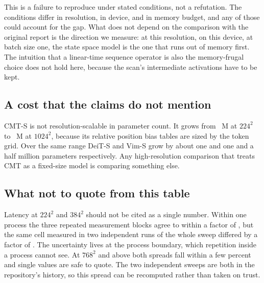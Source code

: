 This is a failure to reproduce under stated conditions, not a refutation.
The conditions differ in resolution, in device, and in memory budget, and any
of those could account for the gap. What does not depend on the comparison
with the original report is the direction we measure: at this resolution, on
this device, at batch size one, the state space model is the one that runs
out of memory first. The intuition that a linear-time sequence operator is
also the memory-frugal choice does not hold here, because the scan's
intermediate activations have to be kept.

\subsection{A cost that the claims do not mention}

CMT-S is not resolution-scalable in parameter count. It grows from
\CmtParamsLow~M at $224^2$ to \CmtParamsHigh~M at $1024^2$, because its
relative position bias tables are sized by the token grid. Over the same
range DeiT-S and Vim-S grow by about one and one and a half million
parameters respectively. Any high-resolution comparison that treats CMT as a
fixed-size model is comparing something else.

\subsection{What not to quote from this table}

Latency at $224^2$ and $384^2$ should not be cited as a single number. Within
one process the three repeated measurement blocks agree to within a factor of
\LatencySpreadHigh{}, but the same cell measured in two independent runs of
the whole sweep differed by a factor of \LatencyBetweenRunSpread{}. The
uncertainty lives at the process boundary, which repetition inside a process
cannot see. At $768^2$ and above both spreads fall within a few percent and
single values are safe to quote. The two independent sweeps are both in the
repository's history, so this spread can be recomputed rather than taken on
trust.
